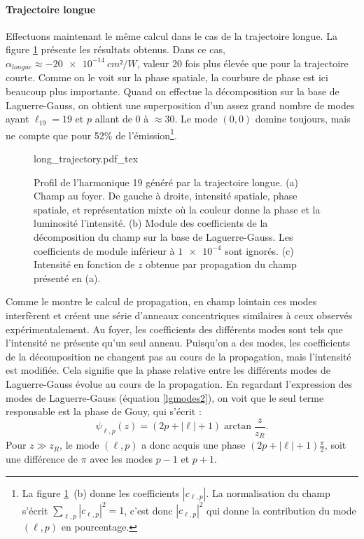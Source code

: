 \paragraph*{Trajectoire longue} Effectuons maintenant le même calcul dans le cas de la trajectoire longue. La figure \ref{Fig:DecompLong} présente les résultats obtenus. Dans ce cas, $\alpha_{longue}\approx\SI{-20e-14}{cm²/W}$, valeur 20 fois plus élevée que pour la trajectoire courte. Comme on le voit sur la phase spatiale, la courbure de phase est ici beaucoup plus importante. Quand on effectue la décomposition sur la base de Laguerre-Gauss, on obtient une superposition d'un assez grand nombre de modes ayant $\ell_{19}=19$ et $p$ allant de 0 à $\approx 30$. Le mode $(0,0)$ domine toujours, mais ne compte que pour 52\% de l'émission\footnote{La figure \ref{Fig:DecompLong}~(b) donne les coefficients $\left|c_{\ell,p}\right|$. La normalisation du champ s'écrit $\sum_{\ell,p}{\left|c_{\ell,p}\right|^2} = 1$, c'est donc $\left|c_{\ell,p}\right|^2$ qui donne la contribution du mode $(\ell,p)$ en pourcentage.}. 

\begin{figure}[!ht]
\centering
\def\svgwidth{\columnwidth}
{long_trajectory.pdf_tex}
\caption{Profil de l'harmonique 19 généré par la trajectoire longue. (a) Champ au foyer. De gauche à droite, intensité spatiale, phase spatiale, et représentation mixte où la couleur donne la phase et la luminosité l'intensité. (b) Module des coefficients de la décomposition du champ sur la base de Laguerre-Gauss. Les coefficients de module inférieur à $\num{1e-4}$ sont ignorés. (c) Intensité en fonction de $z$ obtenue par propagation du champ présenté en (a).}
\label{Fig:DecompLong}
\end{figure}

Comme le montre le calcul de propagation, en champ lointain ces modes interfèrent et créent une série d'anneaux concentriques similaires à ceux observés expérimentalement. Au foyer, les coefficients des différents modes sont tels que l'intensité ne présente qu'un seul anneau. Puisqu'on a des modes, les coefficients de la décomposition ne changent pas au cours de la propagation, mais l'intensité est modifiée. Cela signifie que la phase relative entre les différents modes de Laguerre-Gauss évolue au cours de la propagation. En regardant l'expression des modes de Laguerre-Gauss (équation \ref{lgmodes2}), on voit que le seul terme responsable est la phase de Gouy, qui s'écrit :
\begin{equation*}
\psi _{\ell ,p}(z)=(2p+\left|\ell\right|+1)\arctan{\frac{z}{z_R}}.
\end{equation*}
Pour $z\gg z_R$, le mode $(\ell,p)$ a donc acquis une phase $(2p+\left|\ell\right|+1)\frac{\pi}{2}$, soit une différence de $\pi$ avec les modes $p-1$ et $p+1$. 

